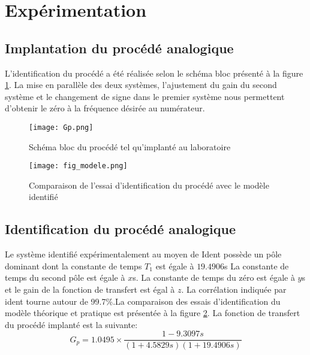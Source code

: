 \section{Expérimentation}
\subsection{Implantation du procédé analogique}
L'identification du procédé a été réalisée selon le schéma bloc présenté à la figure \ref{fig5}. La mise en parallèle des deux systèmes, l'ajustement du gain du second système et le changement de signe dans le premier système nous permettent d'obtenir le zéro à la fréquence désirée au numérateur. 

\begin{figure}[htb]
\centering
\texttt{[image: Gp.png]}
\caption{Schéma bloc du procédé tel qu'implanté au laboratoire}
\label{fig5}
\end{figure}
\begin{figure}[htb]
\centering
\texttt{[image: fig\_modele.png]}
\caption{Comparaison de l'essai d'identification du procédé avec le modèle identifié}
\label{fig7}
\end{figure}
\subsection{Identification du procédé analogique}
\label{identification_procede_analogique}
Le système identifié expérimentalement au moyen de Ident possède un pôle dominant dont la constante de temps $T_1$ est égale à $19.4906$s La constante de temps du second pôle est égale à $x$s. La constante de temps du zéro est égale à $y$s et le gain de la fonction de transfert est égal à $z$. La corrélation indiquée par ident tourne autour de 99.7\%.La comparaison des essais d'identification du modèle théorique et pratique est présentée à la figure \ref{fig7}. La fonction de transfert du procédé implanté est la suivante:
\begin{equation}
\label{eq1}
G_p = 1.0495 \times \frac{1-9.3097s}{(1+4.5829s)(1+19.4906s)}
\end{equation} 

